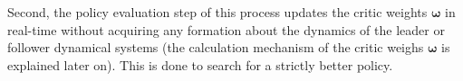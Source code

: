 \documentclass[conference]{IEEEtran}
\begin{document}
%            
%            
%            
%            
%            
%            
%            
%            
%            
%            
 Second, the policy evaluation step of this process updates the critic weights $\bm{\omega}$ in real-time without acquiring any formation about the dynamics of the leader or follower dynamical systems  (the calculation mechanism of the critic weighs $\boldsymbol{\omega}$ is explained later on). This is done to search for a strictly better policy. %
\end{document}
